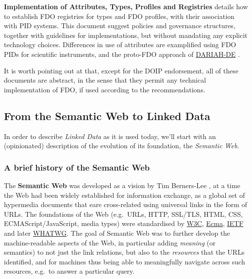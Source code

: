 \documentclass[fleqn,10pt,lineno]{wlpeerjlua}
\begin{document}
\textbf{Implementation of Attributes, Types, Profiles and Registries} \autocite{fdo-ImplAttributesTypesProfiles} details how to establish FDO registries for types and FDO profiles, with their association with PID systems. This document suggest policies and governance structures, together with guidelines for implementations, but without mandating any explicit technology choices. Differences in use of attributes are examplified using FDO PIDs for scientific instruments, and the proto-FDO approach of \href{https://de.dariah.eu/}{DARIAH-DE} \autocite{schwardmannTwoExamplesHow2022}.

It is worth pointing out at that, except for the DOIP endorsement, all of these documents are abstract, in the sense that they permit any technical implementation of FDO, if used according to the recommendations.


\hypertarget{sec:ld}{%
\subsection*{From the Semantic Web to Linked Data}\label{sec:ld}}

In order to describe \emph{Linked Data} as it is used today, we'll start with an (opinionated) description of the evolution of its foundation, the \emph{Semantic Web}.

\hypertarget{sec:semweb}{%
\subsubsection*{A brief history of the Semantic Web}\label{sec:semweb}}

The \textbf{Semantic Web} was developed as a vision by Tim Berners-Lee \autocite{berners-leeWeavingWebOriginal1999}, at a time the Web had been widely established for information exchange, as a global set of hypermedia documents that eare cross-related using universal links in the form of URLs. The foundations of the Web (e.g.~URLs, HTTP, SSL/TLS, HTML, CSS, ECMAScript/JavaScript, media types) were standardised by \href{https://www.w3.org/standards/}{W3C}, \href{https://www.ecma-international.org/}{Ecma}, \href{https://www.ietf.org/standards/}{IETF} and later \href{https://whatwg.org/}{WHATWG}. The goal of Semantic Web was to further develop the machine-readable aspects of the Web, in particular adding \emph{meaning} (or semantics) to not just the link relations, but also to the \emph{resources} that the URLs identified, and for machines thus being able to meaningfully navigate across such resources, e.g.~to answer a particular query.
\end{document}
